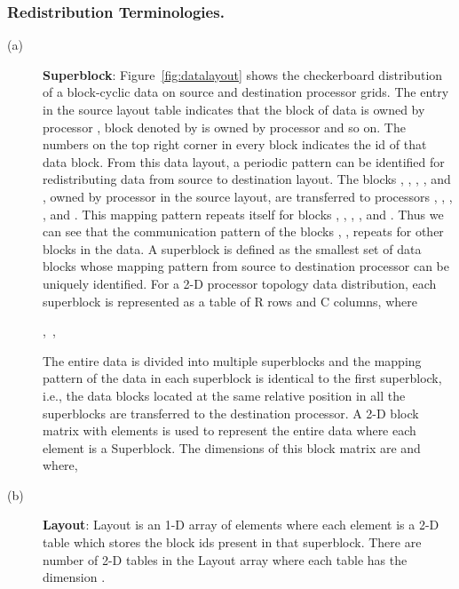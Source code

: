 \documentclass[letterpaper]{llncs}
\begin{document}
\subsubsection{Redistribution Terminologies.}
\begin{description}
\item[(a)] \textbf{Superblock}: Figure~\ref{fig:datalayout} shows the checkerboard distribution of a  block-cyclic data on source and destination processor grids. 
The  entry in the source layout table indicates that the block of data is owned by processor , block denoted by  is owned by processor  and so on. 
The numbers on the top right corner in every block indicates the id of that data block. From this data layout, a periodic pattern can be identified for redistributing
data from source to destination layout. The blocks , , , ,  and , owned by processor  in the source layout, are transferred to processors ,
, , ,  and . This mapping pattern repeats itself for blocks , , , ,  and . 
Thus we can see that the communication pattern of the blocks , ,  repeats for other blocks in the data. 
A superblock is defined as the  smallest set of data blocks whose mapping pattern 
from source to destination processor can be uniquely identified. 
For a 2-D processor topology data distribution, each superblock is represented as 
a table of R rows and C columns, where 

\hspace{0.2in}  ,\,\hspace{1in} ,\,

The entire data is divided into multiple superblocks and the mapping pattern of
the data in each superblock
is identical to the first superblock, i.e., the data blocks located at the same relative position                                                                               in all the superblocks are                                                              transferred to the destination processor.
A 2-D block matrix with  elements is used to represent the entire data where each 
element is a Superblock. The dimensions of this block matrix are  and  where,

\hspace{0.2in} \hspace{0.5in}  \hspace{0.5in}
\item[(b)] \textbf{Layout}: Layout is an 1-D array of  elements where each element 
is a 2-D table which stores the block ids present in that superblock. There are  number of 2-D tables in the Layout array 
where each table has the dimension .


\end{description}
\end{document}

